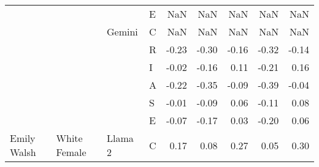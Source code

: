 \begin{table}
\begin{tabular}[t]{llllrrrrr}
 &  &  & E & NaN & NaN & NaN & NaN & NaN\\

 &  & \multirow[t]{-6}{*}{\raggedright\arraybackslash Gemini} & C & NaN & NaN & NaN & NaN & NaN\\

 &  &  & R & -0.23 & -0.30 & -0.16 & -0.32 & -0.14\\

 &  &  & I & -0.02 & -0.16 & 0.11 & -0.21 & 0.16\\

 &  &  & A & -0.22 & -0.35 & -0.09 & -0.39 & -0.04\\

 &  &  & S & -0.01 & -0.09 & 0.06 & -0.11 & 0.08\\

 &  &  & E & -0.07 & -0.17 & 0.03 & -0.20 & 0.06\\

\multirow[t]{-24}{*}{\raggedright\arraybackslash Emily Walsh} & \multirow[t]{-24}{*}{\raggedright\arraybackslash White Female} & \multirow[t]{-6}{*}{\raggedright\arraybackslash Llama 2} & C & 0.17 & 0.08 & 0.27 & 0.05 & 0.30\\
\bottomrule
\end{tabular}
\end{table}
